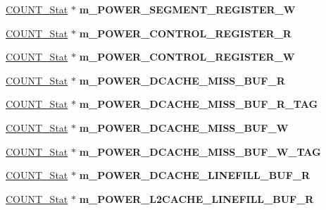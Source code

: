 \begin{DoxyCompactItemize}
\item 
\hypertarget{classall__stats__c_a934bb922b73f65843e868866ceadf9ff}{
\hyperlink{classCOUNT__Stat}{COUNT\_\-Stat} $\ast$ {\bfseries m\_\-POWER\_\-SEGMENT\_\-REGISTER\_\-W}}
\label{classall__stats__c_a934bb922b73f65843e868866ceadf9ff}

\item 
\hypertarget{classall__stats__c_a4787160cb731c39eca083ef77cc55ee2}{
\hyperlink{classCOUNT__Stat}{COUNT\_\-Stat} $\ast$ {\bfseries m\_\-POWER\_\-CONTROL\_\-REGISTER\_\-R}}
\label{classall__stats__c_a4787160cb731c39eca083ef77cc55ee2}

\item 
\hypertarget{classall__stats__c_a649a493ea4509abc31b241d8c98eb89c}{
\hyperlink{classCOUNT__Stat}{COUNT\_\-Stat} $\ast$ {\bfseries m\_\-POWER\_\-CONTROL\_\-REGISTER\_\-W}}
\label{classall__stats__c_a649a493ea4509abc31b241d8c98eb89c}

\item 
\hypertarget{classall__stats__c_a39983376a7d8ab97279f15dfc0d2aa56}{
\hyperlink{classCOUNT__Stat}{COUNT\_\-Stat} $\ast$ {\bfseries m\_\-POWER\_\-DCACHE\_\-MISS\_\-BUF\_\-R}}
\label{classall__stats__c_a39983376a7d8ab97279f15dfc0d2aa56}

\item 
\hypertarget{classall__stats__c_ab04978ee57364fcaa5b65e0c2e5ec7b6}{
\hyperlink{classCOUNT__Stat}{COUNT\_\-Stat} $\ast$ {\bfseries m\_\-POWER\_\-DCACHE\_\-MISS\_\-BUF\_\-R\_\-TAG}}
\label{classall__stats__c_ab04978ee57364fcaa5b65e0c2e5ec7b6}

\item 
\hypertarget{classall__stats__c_a43ddc1e3c97f7d5888d3a5e865b7dcba}{
\hyperlink{classCOUNT__Stat}{COUNT\_\-Stat} $\ast$ {\bfseries m\_\-POWER\_\-DCACHE\_\-MISS\_\-BUF\_\-W}}
\label{classall__stats__c_a43ddc1e3c97f7d5888d3a5e865b7dcba}

\item 
\hypertarget{classall__stats__c_adbadd7e87393f548e2560465aaa1209d}{
\hyperlink{classCOUNT__Stat}{COUNT\_\-Stat} $\ast$ {\bfseries m\_\-POWER\_\-DCACHE\_\-MISS\_\-BUF\_\-W\_\-TAG}}
\label{classall__stats__c_adbadd7e87393f548e2560465aaa1209d}

\item 
\hypertarget{classall__stats__c_a883ce749e465b27aa686bd793718cdb1}{
\hyperlink{classCOUNT__Stat}{COUNT\_\-Stat} $\ast$ {\bfseries m\_\-POWER\_\-DCACHE\_\-LINEFILL\_\-BUF\_\-R}}
\label{classall__stats__c_a883ce749e465b27aa686bd793718cdb1}

\item 
\hypertarget{classall__stats__c_ae147cb825243b62291319624bfa2165a}{
\hyperlink{classCOUNT__Stat}{COUNT\_\-Stat} $\ast$ {\bfseries m\_\-POWER\_\-L2CACHE\_\-LINEFILL\_\-BUF\_\-R}}
\label{classall__stats__c_ae147cb825243b62291319624bfa2165a}


\end{DoxyCompactItemize}
